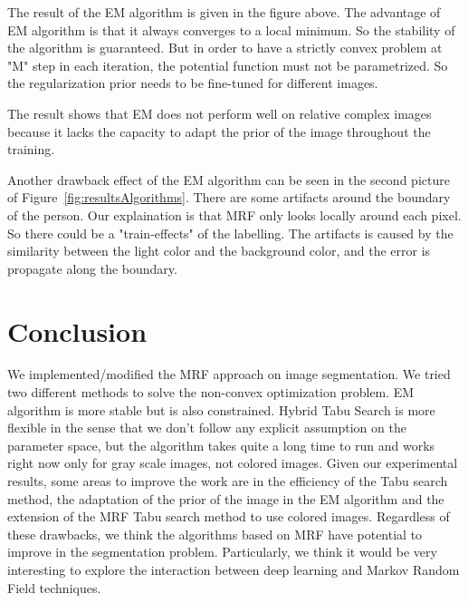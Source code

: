 \documentclass[twoside,10.5pt]{article}
\begin{document}
The result of the EM algorithm is given in the figure above. The advantage of EM algorithm is that it always converges to a local minimum. So the stability of the algorithm is guaranteed. But in order to have a strictly convex problem at "M" step in each iteration, the potential function must not be parametrized. So the regularization prior needs to be fine-tuned for different images.

The result shows that EM does not perform well on relative complex images because it lacks the capacity to adapt the prior of the image throughout the training.

Another drawback effect of the EM algorithm can be seen in the second picture of Figure~\ref{fig:resultsAlgorithms}. There are some artifacts around the boundary of the person. Our explaination is that MRF only looks locally around each pixel. So there could be a "train-effects" of the labelling. The artifacts is caused by the similarity between the light color and the background color, and the error is propagate along the boundary.

\section{Conclusion}
We implemented/modified the MRF approach on image segmentation. We tried two different methods to solve the non-convex optimization problem. EM algorithm is more stable but is also constrained. Hybrid Tabu Search is more flexible in the sense that we don't follow any explicit assumption on the parameter space, but the algorithm takes quite a long time to run and works right now only for gray scale images, not colored images. Given our experimental results, some areas to improve the work are in the efficiency of the Tabu search method, the adaptation of the prior of the image in the EM algorithm and the extension of the MRF Tabu search method to use colored images. Regardless of these drawbacks, we think the algorithms based on MRF have potential to improve in the segmentation problem. Particularly, we think it would be very interesting to explore the interaction between deep learning and Markov Random Field techniques. 


\vskip 0.2in


%
%
\end{document}
